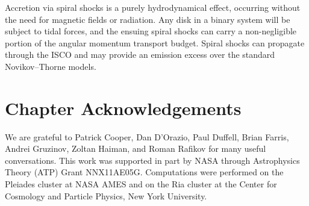Accretion via spiral shocks is a purely hydrodynamical effect, occurring without the need for magnetic fields or radiation.  Any disk in a binary system will be subject to tidal forces, and the ensuing spiral shocks can carry a non-negligible portion of the angular momentum transport budget.  Spiral shocks can propagate through the ISCO and may provide an emission excess over the standard Novikov--Thorne models.

\section{Chapter Acknowledgements} 
We are grateful to Patrick Cooper, Dan D'Orazio, Paul Duffell, Brian Farris, Andrei Gruzinov, Zoltan Haiman, and Roman Rafikov for many useful conversations.  This work was supported in part by NASA through Astrophysics Theory (ATP) Grant NNX11AE05G.  Computations were performed on the Pleiades cluster at NASA AMES and on the Ria cluster at the Center for Cosmology and Particle Physics, New York University.
